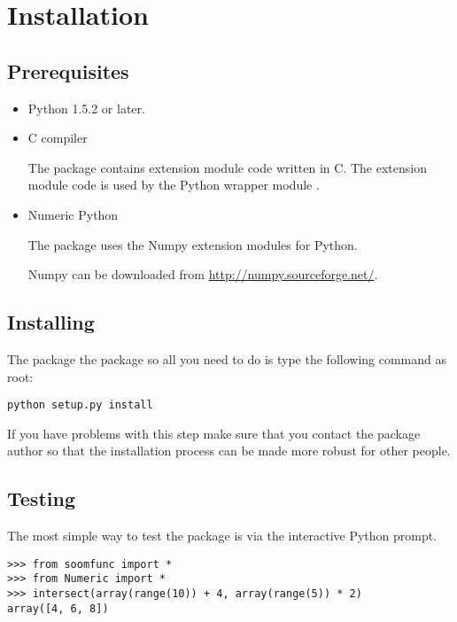%
%
%
\section{Installation}

\subsection{Prerequisites}

\begin{itemize}
\item Python 1.5.2 or later.

\item C compiler

The  package contains extension module code written in C.
The extension module code is used by the Python wrapper module
.

\item Numeric Python

The  package uses the Numpy extension modules for Python.

Numpy can be downloaded from \url{http://numpy.sourceforge.net/}.
\end{itemize}

\subsection{Installing}

The  package the  package so all you
need to do is type the following command as root:

\begin{verbatim}
python setup.py install
\end{verbatim}

If you have problems with this step make sure that you contact the
package author so that the installation process can be made more
robust for other people.

\subsection{Testing}

The most simple way to test the  package is via the
interactive Python prompt.

\begin{verbatim}
>>> from soomfunc import *
>>> from Numeric import *
>>> intersect(array(range(10)) + 4, array(range(5)) * 2)
array([4, 6, 8])
\end{verbatim}
